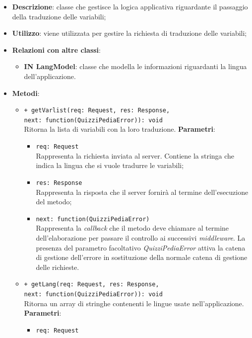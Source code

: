 \begin{itemize}
	\item 
	\textbf{Descrizione}:
	classe che gestisce la logica applicativa riguardante il passaggio della traduzione delle variabili;
	\item \textbf{Utilizzo}:
	viene utilizzata per gestire la richiesta di traduzione delle variabili;
	\item \textbf{Relazioni con altre classi}:
	\begin{itemize}
		\item \textbf{IN LangModel}: classe che modella le informazioni riguardanti la lingua dell'applicazione.
	\end{itemize}
	\item \textbf{Metodi}:
		\begin{itemize}
			\item \texttt{+ getVarlist(req: Request, res: Response,\\ next: function(QuizziPediaError)): void} \\
			Ritorna la lista di variabili con la loro traduzione.
			\textbf{Parametri}:
				\begin{itemize}
					\item \texttt{req: Request} \\
					Rappresenta la richiesta inviata al server. Contiene la stringa che indica la lingua che si vuole tradurre le variabili;
					\item \texttt{res: Response} \\
					Rappresenta la risposta che il server fornirà al termine  dell'esecuzione del metodo;
					\item \texttt{next: function(QuizziPediaError)} \\
					Rappresenta la \textit{callback} che il metodo deve chiamare al termine dell'elaborazione per passare il controllo ai successivi \textit{middleware}. La presenza del parametro facoltativo \textit{QuizziPediaError} attiva la catena di gestione dell'errore in sostituzione della normale catena di gestione delle richieste.
				\end{itemize}
				\item \texttt{+ getLang(req: Request, res: Response,\\ next: function(QuizziPediaError)): void} \\
				Ritorna un array di stringhe contenenti le lingue usate nell'applicazione. 
			\textbf{Parametri}:
				\begin{itemize}
					\item \texttt{req: Request} \\

\end{itemize}
\end{itemize}
\end{itemize}
